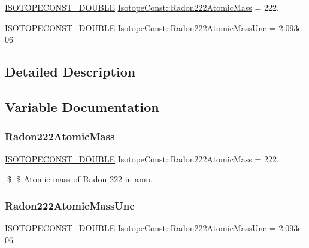 \begin{DoxyCompactItemize}
\item 
\mbox{\hyperlink{group___isotope_const-_macros_ga8f45a7272ce02c0b4c65c44636ed719a}{I\+S\+O\+T\+O\+P\+E\+C\+O\+N\+S\+T\+\_\+\+D\+O\+U\+B\+LE}} \mbox{\hyperlink{group___isotope_const-_radon-_rn222_ga977381ed3530283f08e5d73dcad0feaa}{Isotope\+Const\+::\+Radon222\+Atomic\+Mass}} = 222.
\item 
\mbox{\hyperlink{group___isotope_const-_macros_ga8f45a7272ce02c0b4c65c44636ed719a}{I\+S\+O\+T\+O\+P\+E\+C\+O\+N\+S\+T\+\_\+\+D\+O\+U\+B\+LE}} \mbox{\hyperlink{group___isotope_const-_radon-_rn222_ga576bb619c41e9a4be4c74479f386fdde}{Isotope\+Const\+::\+Radon222\+Atomic\+Mass\+Unc}} = 2.\+093e-\/06
\end{DoxyCompactItemize}


\subsection{Detailed Description}


\subsection{Variable Documentation}
\mbox{\label{group___isotope_const-_radon-_rn222_ga977381ed3530283f08e5d73dcad0feaa}} 
\subsubsection{\texorpdfstring{Radon222\+Atomic\+Mass}{Radon222AtomicMass}}
{\footnotesize\ttfamily \mbox{\hyperlink{group___isotope_const-_macros_ga8f45a7272ce02c0b4c65c44636ed719a}{I\+S\+O\+T\+O\+P\+E\+C\+O\+N\+S\+T\+\_\+\+D\+O\+U\+B\+LE}} Isotope\+Const\+::\+Radon222\+Atomic\+Mass = 222.}

\$ \$ Atomic mass of Radon-\/222 in amu. \mbox{\label{group___isotope_const-_radon-_rn222_ga576bb619c41e9a4be4c74479f386fdde}} 
\subsubsection{\texorpdfstring{Radon222\+Atomic\+Mass\+Unc}{Radon222AtomicMassUnc}}
{\footnotesize\ttfamily \mbox{\hyperlink{group___isotope_const-_macros_ga8f45a7272ce02c0b4c65c44636ed719a}{I\+S\+O\+T\+O\+P\+E\+C\+O\+N\+S\+T\+\_\+\+D\+O\+U\+B\+LE}} Isotope\+Const\+::\+Radon222\+Atomic\+Mass\+Unc = 2.\+093e-\/06}

